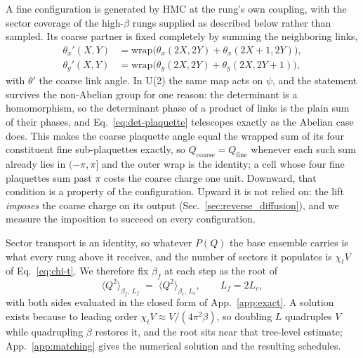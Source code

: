 \documentclass[prd, twocolumn, superscriptaddress, nofootinbib,floatfix]{revtex4-2}
\DeclareRobustCommand{\Eq}[1]{Eq.~\eqref{eq:#1}}
\DeclareRobustCommand{\app}[1]{App.~\ref{app:#1}}
\DeclareRobustCommand{\sect}[1]{Sec.~\ref{sec:#1}}
\begin{document}
A fine configuration is generated by HMC at the rung's own coupling, with the
sector coverage of the high-$\beta$ rungs supplied as described below rather
than sampled. Its coarse partner is fixed completely by summing the neighboring links,
\begin{align*}
\theta_x'(X,Y) &= \mathrm{wrap}\big(\theta_x(2X,2Y) + \theta_x(2X+1,2Y)\big),\\
\theta_y'(X,Y) &= \mathrm{wrap}\big(\theta_y(2X,2Y) + \theta_y(2X,2Y+1)\big),
\end{align*}
with $\theta'$ the coarse link angle. In U(2) the same map acts on $\psi$, and
the statement survives the non-Abelian group for one reason: the determinant is
a homomorphism, so the determinant phase of a product of links is the plain sum
of their phases, and \Eq{det-plaquette} telescopes exactly as the Abelian case
does. This makes the coarse plaquette angle equal
the wrapped sum of its four constituent fine sub-plaquettes exactly, so
$Q_{\mathrm{coarse}} = Q_{\mathrm{fine}}$ whenever each such sum already lies in
$(-\pi,\pi]$ and the outer wrap is the identity; a cell whose four fine
plaquettes sum past $\pi$ costs the coarse charge one unit. Downward, that
condition is a property of the configuration. Upward it is not relied on: the
lift \emph{imposes} the coarse charge on its output
(\sect{reverse_diffusion}), and we measure the imposition to succeed on every
configuration.

Sector transport is an identity, so whatever $P(Q)$ the base ensemble carries is what
every rung above it receives, and the number of sectors it populates is
$\chi_t V$ of \Eq{chi-t}. We therefore fix $\beta_f$ at each step as the root
of
\begin{equation}
    \langle Q^2\rangle_{\beta_f,\,L_f} \;=\; \langle Q^2\rangle_{\beta_c,\,L_c},
    \qquad L_f = 2L_c,
    \label{eq:topology-matching}
\end{equation}
with both sides evaluated in the closed form of \app{exact}. A solution exists
because to leading order $\chi_t V\approx V/(4\pi^2\beta)$, so doubling $L$
quadruples $V$ while quadrupling $\beta$ restores it, and the root sits near
that tree-level estimate; \app{matching} gives the numerical solution and the
resulting schedules.
\end{document}
